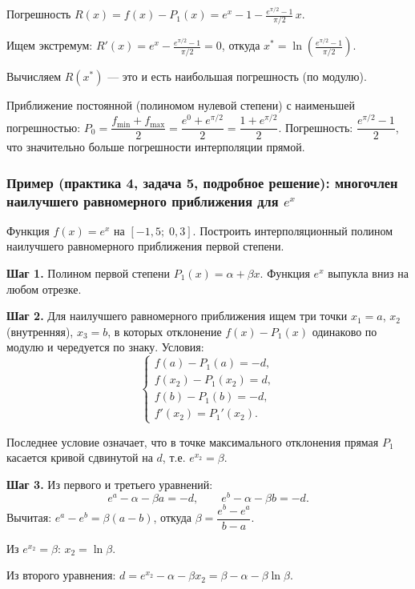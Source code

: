 Погрешность $R(x) = f(x) - P_1(x) = e^x - 1 - \frac{e^{\pi/2} - 1}{\pi/2}\, x$.

Ищем экстремум: $R'(x) = e^x - \frac{e^{\pi/2} - 1}{\pi/2} = 0$, откуда $x^* = \ln\!\left(\frac{e^{\pi/2} - 1}{\pi/2}\right)$.

Вычисляем $R(x^*)$ --- это и есть наибольшая погрешность (по модулю).

Приближение постоянной (полиномом нулевой степени) с наименьшей погрешностью: $P_0 = \dfrac{f_{\min} + f_{\max}}{2} = \dfrac{e^0 + e^{\pi/2}}{2} = \dfrac{1 + e^{\pi/2}}{2}$. Погрешность: $\dfrac{e^{\pi/2} - 1}{2}$, что значительно больше погрешности интерполяции прямой.


\subsubsection*{Пример (практика 4, задача 5, подробное решение): многочлен наилучшего равномерного приближения для $e^x$}

Функция $f(x) = e^x$ на $[-1{,}5;\; 0{,}3]$. Построить интерполяционный полином наилучшего равномерного приближения первой степени.

\textbf{Шаг 1.} Полином первой степени $P_1(x) = \alpha + \beta x$. Функция $e^x$ выпукла вниз на любом отрезке.

\textbf{Шаг 2.} Для наилучшего равномерного приближения ищем три точки $x_1 = a$, $x_2$ (внутренняя), $x_3 = b$, в которых отклонение $f(x) - P_1(x)$ одинаково по модулю и чередуется по знаку. Условия:
\[
    \begin{cases}
        f(a) - P_1(a) = -d, \\
        f(x_2) - P_1(x_2) = d, \\
        f(b) - P_1(b) = -d, \\
        f'(x_2) = P_1'(x_2).
    \end{cases}
\]

Последнее условие означает, что в точке максимального отклонения прямая $P_1$ касается кривой сдвинутой на $d$, т.е. $e^{x_2} = \beta$.

\textbf{Шаг 3.} Из первого и третьего уравнений:
\[
    e^a - \alpha - \beta a = -d, \qquad e^b - \alpha - \beta b = -d.
\]
Вычитая: $e^a - e^b = \beta(a - b)$, откуда $\beta = \dfrac{e^b - e^a}{b - a}$.

Из $e^{x_2} = \beta$: $x_2 = \ln\beta$.

Из второго уравнения: $d = e^{x_2} - \alpha - \beta x_2 = \beta - \alpha - \beta\ln\beta$.

